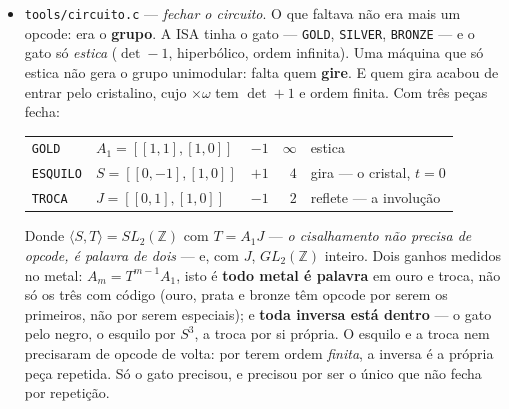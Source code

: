 \documentclass[11pt]{article}
\newcommand{\code}[1]{\texttt{\small #1}}
\newcommand{\Z}{\mathbb Z}
\theoremstyle{plain}
\theoremstyle{remark}
\begin{document}
\begin{itemize}
\[ \code{NEGRO\_OURO/PRATA/BRONZE}: \quad A_n^{-1} = J\,A_{-n}\,J = [[0,1],[1,-n]], \qquad
 (a,b) \mapsto (b,\ a - n b). \]

\textbf{Inteira, e sem uma única divisão} --- porque $\det A_n = -1$. Um opcode que precisasse de
dividir não caberia nesta máquina; este não precisa. E o que destravou não foi engenharia: foi
saber \emph{o que a inversa é} --- a antípoda ($n \mapsto -n$) conjugada pela involução $J$, a
mesma peça virada --- em vez de a tratar como uma segunda máquina que a ISA teria de aprender do
zero. A reversibilidade não foi acrescentada à ISA: ela já estava no determinante, e só faltava
escrevê-la. Os três códigos entram no \emph{fim} do enumerado, de modo que nenhum programa já
compilado passe a significar outra coisa. Medido no metal em $675$ pares por metal, nos dois
sentidos, e com o toolkit a \emph{conferir} em vez de executar.
\item \code{tools/circuito.c} --- \emph{fechar o circuito}. O que faltava não era mais um
opcode: era o \textbf{grupo}. A ISA tinha o gato --- \code{GOLD}, \code{SILVER}, \code{BRONZE}
--- e o gato só \emph{estica} ($\det -1$, hiperbólico, ordem infinita). Uma máquina que só estica
não gera o grupo unimodular: falta quem \textbf{gire}. E quem gira acabou de entrar pelo
cristalino, cujo $\times\omega$ tem $\det +1$ e ordem finita. Com três peças fecha:

\begin{center}\begin{tabular}{llrrl}
\code{GOLD} & $A_1 = [[1,1],[1,0]]$ & $-1$ & $\infty$ & estica \\
\code{ESQUILO} & $S = [[0,-1],[1,0]]$ & $+1$ & $4$ & gira --- o cristal, $t=0$ \\
\code{TROCA} & $J = [[0,1],[1,0]]$ & $-1$ & $2$ & reflete --- a involução \\
\end{tabular}\end{center}

Donde $\langle S,T\rangle = SL_2(\Z)$ com $T = A_1 J$ --- \emph{o cisalhamento não precisa de
opcode, é palavra de dois} --- e, com $J$, $GL_2(\Z)$ inteiro. Dois ganhos medidos no metal:
$A_m = T^{m-1}A_1$, isto é \textbf{todo metal é palavra} em ouro e troca, não só os três com
código (ouro, prata e bronze têm opcode por serem os primeiros, não por serem especiais); e
\textbf{toda inversa está dentro} --- o gato pelo negro, o esquilo por $S^3$, a troca por si
própria. O esquilo e a troca nem precisaram de opcode de volta: por terem ordem \emph{finita}, a
inversa é a própria peça repetida. Só o gato precisou, e precisou por ser o único que não fecha
por repetição.


\end{itemize}
\end{document}
